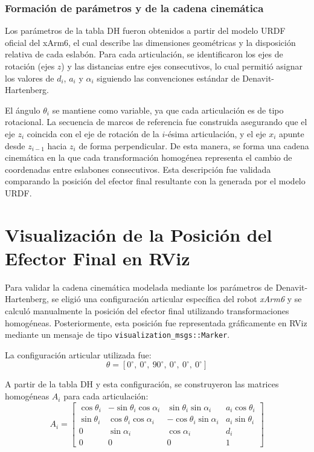 \documentclass[conference]{IEEEtran}
\begin{document}
\subsubsection*{Formación de parámetros y de la cadena cinemática}

Los parámetros de la tabla DH fueron obtenidos a partir del modelo URDF oficial del xArm6, el cual describe las dimensiones geométricas y la disposición relativa de cada eslabón. Para cada articulación, se identificaron los ejes de rotación (ejes $z$) y las distancias entre ejes consecutivos, lo cual permitió asignar los valores de $d_i$, $a_i$ y $\alpha_i$ siguiendo las convenciones estándar de Denavit-Hartenberg. 

El ángulo $\theta_i$ se mantiene como variable, ya que cada articulación es de tipo rotacional. La secuencia de marcos de referencia fue construida asegurando que el eje $z_i$ coincida con el eje de rotación de la $i$-ésima articulación, y el eje $x_i$ apunte desde $z_{i-1}$ hacia $z_i$ de forma perpendicular. De esta manera, se forma una cadena cinemática en la que cada transformación homogénea representa el cambio de coordenadas entre eslabones consecutivos. Esta descripción fue validada comparando la posición del efector final resultante con la generada por el modelo URDF.


\section{Visualización de la Posición del Efector Final en RViz}

Para validar la cadena cinemática modelada mediante los parámetros de Denavit-Hartenberg, se eligió una configuración articular específica del robot \textit{xArm6} y se calculó manualmente la posición del efector final utilizando transformaciones homogéneas. Posteriormente, esta posición fue representada gráficamente en RViz mediante un mensaje de tipo \texttt{visualization\_msgs::Marker}.

La configuración articular utilizada fue:
\begin{equation}
\theta = [0^\circ,\ 0^\circ,\ 90^\circ,\ 0^\circ,\ 0^\circ,\ 0^\circ]
\end{equation}

A partir de la tabla DH y esta configuración, se construyeron las matrices homogéneas $A_i$ para cada articulación:
\[
A_i = 
\begin{bmatrix}
\cos\theta_i & -\sin\theta_i\cos\alpha_i & \sin\theta_i\sin\alpha_i & a_i\cos\theta_i \\
\sin\theta_i & \cos\theta_i\cos\alpha_i & -\cos\theta_i\sin\alpha_i & a_i\sin\theta_i \\
0 & \sin\alpha_i & \cos\alpha_i & d_i \\
0 & 0 & 0 & 1
\end{bmatrix}
\]
\end{document}
